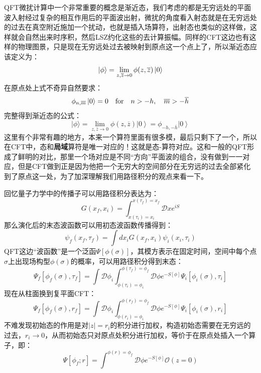 QFT微扰计算中一个非常重要的概念是渐近态，我们考虑的都是无穷远处的平面波入射经过复杂的相互作用后的平面波出射，微扰的角度看入射态就是在无穷远处的过去在真空附近施加一个扰动，也就是插入场算符，出射态也类似的这样做，这样就会自然出来时序积，然后LSZ约化这些的去计算振幅。同样的CFT这边也有这样的物理图景，只是现在无穷远处过去被映射到原点这一个点上了，所以渐近态应该定义为：
\begin{equation}
	\ket{\phi}=\lim_{z,\overline{z}\to0}\phi(z,\overline{z})\ket{0}
\end{equation}
在原点处上式不奇异自然要求：
\begin{equation}\label{eq:30.6}
	\phi_{n,\overline{m}}\ket{0} =0\quad\text{for}\quad n>-h,\quad\overline{m}>-\overline{h}
\end{equation}
完整得到渐近态的公式：
\begin{equation}
	\boxed{|\phi\rangle=\lim\limits_{z,\overline{z}\to0}\phi(z,\overline{z})\left|0\right\rangle=\phi_{-h,-\overline{h}}\left|0\right\rangle}
\end{equation}
这里有个非常有趣的地方，本来一个算符里面有很多模，最后只剩下了一个，所以在CFT中，态和\textbf{局域}算符是唯一对应的！这就是态\mbox{-}算符对应。这和一般的QFT形成了鲜明的对比，那里一个场对应是不同“方向”平面波的组合，没有做到一一对应，但是CFT做到正是因为他把一个无穷大的空间部分在无穷远的过去全部紧化到了原点这一处，为了加深理解我们用路径积分的观点来看一下。

回忆量子力学中的传播子可以用路径积分表达为：
\begin{equation}
	G(x_f,x_i)=\int_{x(\tau_i)=x_i}^{x(\tau_f)=x_f}\mathcal{D}xe^{iS}
\end{equation}
那么演化后的末态波函数可以用初态波函数传播得到：
\begin{equation}
	\psi_{f}(x_{f},\tau_{f})=\int dx_{i}G(x_{f},x_{i})\psi_{i}(x_{i},\tau_{i})
\end{equation}
QFT这边“波函数”是一个泛函$\Psi[\phi(\sigma)]$，其模方表示在固定时间，空间中每个点$\sigma$上出现场构型$\phi(\sigma)$的概率，可以用路径积分得到末态：
\begin{equation}
	\Psi_f[\phi_f(\sigma),\tau_f]=\int\mathcal{D}\phi_i\int_{\phi(\tau_i)=\phi_i}^{\phi(\tau_f)=\phi_f}\mathcal{D}\phi e^{-S[\phi]}\Psi_i[\phi_i(\sigma),\tau_i]
\end{equation}
现在从柱面换到复平面CFT：
\begin{equation}
	\Psi_f[\phi_f(\sigma),r_f]=\int\mathcal{D}\phi_i\int_{\phi(r_i)=\phi_i}^{\phi(r_f)=\phi_f}\mathcal{D}\phi e^{-S[\phi]}\Psi_i[\phi_i(\sigma),r_i]
\end{equation}
不难发现初始态的作用是对$|z|=r_i$的积分进行加权，构造初始态需要在无穷远的过去，$r_i\to 0$，从而初始态只对原点处积分进行加权，等价于在原点处插入一个算子，即：
\begin{equation}
	\Psi[\phi_f;r]=\int^{\phi(r)=\phi_f}\mathcal{D}\phi e^{-S[\phi]}\mathcal{O}(z=0)
\end{equation}

